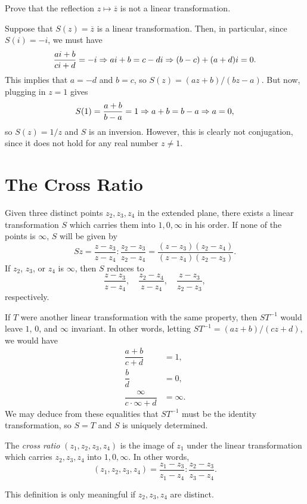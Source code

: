\begin{exercise}
	Prove that the reflection $z \mapsto \overline{z}$ is not a linear transformation.
	
	\begin{sol}
		Suppose that $S(z)=\overline{z}$ is a linear transformation. Then, in particular, since $S(i)=-i$, we must have $$\dfrac{ai+b}{ci+d}=-i \Rightarrow ai+b=c-di \Rightarrow (b-c)+(a+d)i=0.$$ This implies that $a=-d$ and $b=c$, so $S(z)=(az+b)/(bz-a)$. But now, plugging in $z=1$ gives $$S(1)=\dfrac{a+b}{b-a}=1 \Rightarrow a+b=b-a \Rightarrow a=0,$$ so $S(z)=1/z$ and $S$ is an inversion. However, this is clearly not conjugation, since it does not hold for any real number $z \neq 1$.
	\end{sol}
\end{exercise}

\section{The Cross Ratio}
Given three distinct points $z_2,z_3,z_4$ in the extended plane, there exists a linear transformation $S$ which carries them into $1,0,\infty$ in his order. If none of the points is $\infty$, $S$ will be given by $$Sz=\dfrac{z-z_3}{z-z_4} \colon \dfrac{z_2-z_3}{z_2-z_4}=\dfrac{(z-z_3)(z_2-z_4)}{(z-z_4)(z_2-z_3)}.$$ If $z_2$, $z_3$, or $z_4$ is $\infty$, then $S$ reduces to $$\dfrac{z-z_3}{z-z_4}, \quad \dfrac{z_2-z_4}{z-z_4}, \quad \dfrac{z-z_3}{z_2-z_3},$$ respectively.

If $T$ were another linear transformation with the same property, then $ST^{-1}$ would leave $1$, $0$, and $\infty$ invariant. In other words, letting $ST^{-1}=(az+b)/(cz+d)$, we would have
\begin{align*}
	\dfrac{a+b}{c+d} &=1, \\
	\dfrac{b}{d} &=0, \\
	\dfrac{\infty}{c \cdot \infty+d} &=\infty.
\end{align*}
We may deduce from these equalities that $ST^{-1}$ must be the identity transformation, so $S=T$ and $S$ is uniquely determined.

\begin{definition}
	The \emph{cross ratio} $(z_1,z_2,z_3,z_4)$ is the image of $z_1$ under the linear transformation which carries $z_2,z_3,z_4$ into $1,0,\infty$. In other words, $$(z_1,z_2,z_3,z_4)=\dfrac{z_1-z_3}{z_1-z_4} \colon \dfrac{z_2-z_3}{z_3-z_4}.$$
\end{definition}

This definition is only meaningful if $z_2,z_3,z_4$ are distinct.

